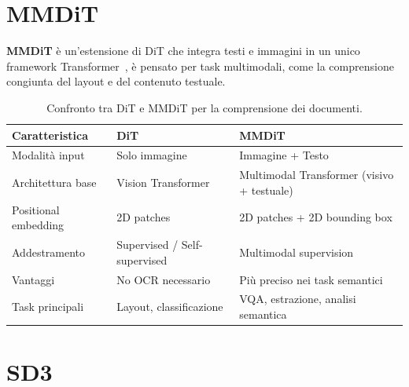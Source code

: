 \section{MMDiT}

\textbf{MMDiT} è un'estensione di DiT che integra testi e immagini in un unico framework Transformer~\cite{zhang2023mmdetdit}, è pensato per task multimodali, come la comprensione congiunta del layout e del contenuto testuale.

\begin{table}[htbp]
\centering
\begin{adjustbox}{width=0.9\textwidth}
\begin{tabular}{|l|p{5.5cm}|p{6cm}|}
\hline
\textbf{Caratteristica} & \textbf{DiT} & \textbf{MMDiT} \\
\hline
Modalità input & Solo immagine & Immagine + Testo \\
\hline
Architettura base & Vision Transformer & Multimodal Transformer (visivo + testuale) \\
\hline
Positional embedding & 2D patches & 2D patches + 2D bounding box \\
\hline
Addestramento & Supervised / Self-supervised & Multimodal supervision \\
\hline
Vantaggi & No OCR necessario & Più preciso nei task semantici \\
\hline
Task principali & Layout, classificazione & VQA, estrazione, analisi semantica \\
\hline
\end{tabular}
\end{adjustbox}
\caption{Confronto tra DiT e MMDiT per la comprensione dei documenti.}
\end{table}

\section{SD3}

